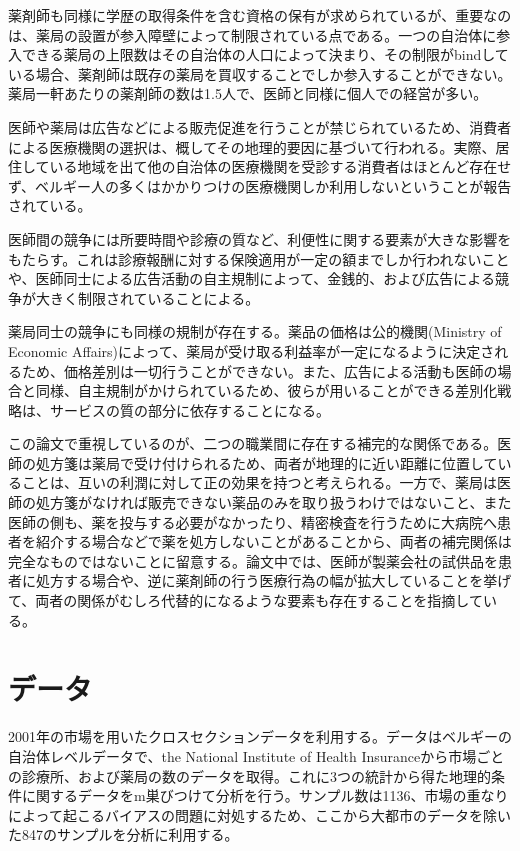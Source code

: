 \documentclass[11pt]{jsarticle}
\begin{document}
薬剤師も同様に学歴の取得条件を含む資格の保有が求められているが、重要なのは、薬局の設置が参入障壁によって制限されている点である。一つの自治体に参入できる薬局の上限数はその自治体の人口によって決まり、その制限がbindしている場合、薬剤師は既存の薬局を買収することでしか参入することができない。薬局一軒あたりの薬剤師の数は1.5人で、医師と同様に個人での経営が多い。

医師や薬局は広告などによる販売促進を行うことが禁じられているため、消費者による医療機関の選択は、概してその地理的要因に基づいて行われる。実際、居住している地域を出て他の自治体の医療機関を受診する消費者はほとんど存在せず、ベルギー人の多くはかかりつけの医療機関しか利用しないということが報告されている。

医師間の競争には所要時間や診療の質など、利便性に関する要素が大きな影響をもたらす。これは診療報酬に対する保険適用が一定の額までしか行われないことや、医師同士による広告活動の自主規制によって、金銭的、および広告による競争が大きく制限されていることによる。

薬局同士の競争にも同様の規制が存在する。薬品の価格は公的機関(Ministry of Economic Affairs)によって、薬局が受け取る利益率が一定になるように決定されるため、価格差別は一切行うことができない。また、広告による活動も医師の場合と同様、自主規制がかけられているため、彼らが用いることができる差別化戦略は、サービスの質の部分に依存することになる。

この論文で重視しているのが、二つの職業間に存在する補完的な関係である。医師の処方箋は薬局で受け付けられるため、両者が地理的に近い距離に位置していることは、互いの利潤に対して正の効果を持つと考えられる。一方で、薬局は医師の処方箋がなければ販売できない薬品のみを取り扱うわけではないこと、また医師の側も、薬を投与する必要がなかったり、精密検査を行うために大病院へ患者を紹介する場合などで薬を処方しないことがあることから、両者の補完関係は完全なものではないことに留意する。論文中では、医師が製薬会社の試供品を患者に処方する場合や、逆に薬剤師の行う医療行為の幅が拡大していることを挙げて、両者の関係がむしろ代替的になるような要素も存在することを指摘している。

\section{データ}

2001年の市場を用いたクロスセクションデータを利用する。データはベルギーの自治体レベルデータで、the National Institute of Health Insuranceから市場ごとの診療所、および薬局の数のデータを取得。これに3つの統計から得た地理的条件に関するデータをm巣びつけて分析を行う。サンプル数は1136、市場の重なりによって起こるバイアスの問題に対処するため、ここから大都市のデータを除いた847のサンプルを分析に利用する。
\end{document}
